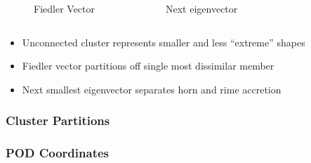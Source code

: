 \documentclass[9pt]{beamer}
\begin{document}
\begin{frame}
\begin{columns}[c]
\begin{figure}
      \caption{Fiedler Vector}
    \end{figure}
    \centering
    \vspace*{-0.0cm}\begin{figure}
      \caption{Next eigenvector}
    \end{figure}
\end{columns}
\begin{itemize}
\item Unconnected cluster represents smaller and less ``extreme'' shapes
\item Fiedler vector partitions off single most dissimilar member
\item Next smallest eigenvector separates horn and rime accretion
\end{itemize}
\end{frame}
\begin{frame}
\frametitle{Cluster Partitions}
\label{sec-3-5}
\end{frame}
\begin{frame}
\frametitle{POD Coordinates}
\label{sec-3-6}
\end{frame}
\end{document}

